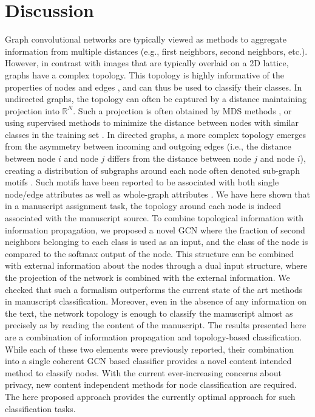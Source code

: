 \section{Discussion}

Graph convolutional networks are typically viewed as methods to aggregate information from multiple distances (e.g., first neighbors, second neighbors, etc.).  However, in contrast with images that are typically overlaid on a 2D lattice, graphs have a complex topology. This topology is highly informative of the properties of nodes and edges \cite{rosen2016topological}\cite{naaman2019edge}, and can thus be used to classify their classes.
In undirected graphs, the topology can often be captured by a distance maintaining projection into $\mathbb{R}^{N}$. Such a projection is often obtained by MDS methods \cite{kruskal1964multidimensional}, or using supervised methods to minimize the distance between nodes with similar classes in the training set \cite{cao2016deep}. In directed graphs, a more complex topology emerges from the asymmetry between incoming and outgoing edges (i.e., the distance between node $i$ and node $j$ differs from the distance between node $j$ and node $i$), creating a distribution of subgraphs around each node often denoted sub-graph motifs \cite{milo2002network}.  Such motifs have been reported to be associated with both single node/edge attributes as well as whole-graph attributes \cite{shen2002network}.  We have here shown that in a manuscript assignment task, the topology around each node is indeed associated with the manuscript source. 
To combine topological information with information propagation, we proposed a novel GCN where the fraction of second neighbors belonging to each class is used as an input, and the class of the node is compared to the softmax output of the node. This structure can be combined with external information about the nodes through a dual input structure, where the projection of the network is combined with the external information. We checked that such a formalism outperforms the current state of the art methods in manuscript classification. Moreover, even in the absence of any information on the text, the network topology is enough to classify the manuscript almost as precisely as by reading the content of the manuscript.
The results presented here are a combination of information propagation and topology-based classification. While each of these two elements were previously reported, their combination into a single coherent GCN based classifier provides a novel content intended method to classify nodes.  With the current ever-increasing concerns about privacy, new content independent methods for node classification are required. The here proposed approach provides the currently optimal approach for such classification tasks. 
